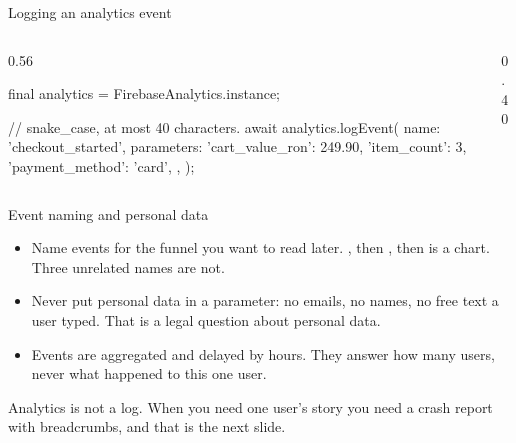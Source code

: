 \documentclass[10pt,aspectratio=169,t]{beamer}
\begin{document}
\begin{frame}[fragile,eyebrow=Observability]{Logging an analytics event}
  \begin{columns}[T]
    \begin{column}{0.56\textwidth}
\begin{dart}
final analytics =
    FirebaseAnalytics.instance;

// snake_case, at most 40 characters.
await analytics.logEvent(
  name: 'checkout_started',
  parameters: {
    'cart_value_ron': 249.90,
    'item_count': 3,
    'payment_method': 'card',
  },
);
\end{dart}
    \end{column}
    \begin{column}{0.40\textwidth}
      \vskip 2mm
    \end{column}
  \end{columns}
\end{frame}

\begin{frame}[eyebrow=Observability]{Event naming and personal data}
  \vskip 2mm
  \begin{itemize}
    \item Name events for the funnel you want to read later. , then , then  is a chart. Three unrelated names are not.
    \item Never put personal data in a parameter: no emails, no names, no free text a user typed. That is a legal question about personal data.
    \item Events are aggregated and delayed by hours. They answer how many users, never what happened to this one user.
  \end{itemize}
  \begin{takeaway}{Analytics is not a log.}
    When you need one user's story you need a crash report with breadcrumbs, and that is the next slide.
  \end{takeaway}
\end{frame}
\end{document}
